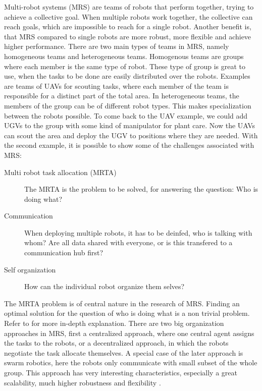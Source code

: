         Multi-robot systems (MRS) are teams of robots that perform together, trying to achieve a collective goal. When multiple robots work together, the collective can reach goals, which are impossible to reach for a single robot. Another benefit is, that MRS compared to single robots are more robust, more flexible and achieve higher performance. \cite{Albani2017}
        There are two main types of teams in MRS, namely homogeneous teams and heterogeneous teams. Homogenous teams are groups where each member is the same type of robot. These type of group is great to use, when the tasks to be done are easily distributed over the robots. Examples are teams of UAVs for scouting tasks, where each member of the team is responsible for a distinct part of the total area. 
        In heterogeneous teams, the members of the group can be of different robot types. This makes specialization between the robots possible. To come back to the UAV example, we could add UGVs to the group with some kind of manipulator for plant care. Now the UAVs can scout the area and deploy the UGV to positions where they are needed. 
        With the second example, it is possible to show some of the challenges associated with MRS: \ \begin{description}
            \item[Multi robot task allocation (MRTA)] The MRTA is the problem to be solved, for answering the question: Who is doing what?
            \item[Communication] When deploying multiple robots, it has to be deinfed, who is talking with whom? Are all data shared with everyone, or is this transfered to a communication hub first?
            \item[Self organization] How can the individual robot organize them selves?  
        \end{description}

        The MRTA problem is of central nature in the research of MRS. Finding an optimal solution for the question of who is doing what is a non trivial problem. Refer to \cite{Gerkey2004} for more in-depth explanation. There are two big organization approaches in MRS, first a centralized approach, where one central agent assigns the tasks to the robots, or a decentralized approach, in which the robots negotiate the task allocate themselves. A special case of the later approach is swarm robotics, here the robots only communicate with small subset of the whole group. This approach has very interesting characteristics, especially a great scalability, much higher robustness and flexibility \cite{Albani2017}.

